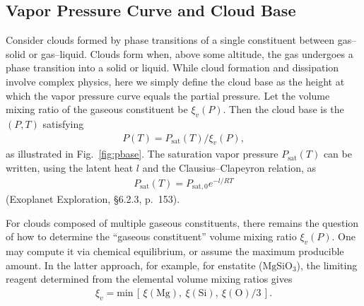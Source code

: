 \subsection*{Vapor Pressure Curve and Cloud Base}

Consider clouds formed by phase transitions of a single constituent between gas–solid or gas–liquid.  
Clouds form when, above some altitude, the gas undergoes a phase transition into a solid or liquid.  
While cloud formation and dissipation involve complex physics, here we simply define the cloud base as the height at which the vapor pressure curve equals the partial pressure.  
Let the volume mixing ratio of the gaseous constituent be $\xi_v(P)$.  
Then the cloud base is the $(P,T)$ satisfying
\begin{align}
P(T) = P_\mathrm{sat}(T)/\xi_v(P),
\end{align}
as illustrated in Fig.~\ref{fig:pbase}.  
The saturation vapor pressure $P_\mathrm{sat}(T)$ can be written, using the latent heat $l$ and the Clausius–Clapeyron relation, as
\begin{align}
P_\mathrm{sat}(T) = P_\mathrm{sat,0} e^{-l/RT}
\end{align}
(Exoplanet Exploration, §6.2.3, p.~153).

For clouds composed of multiple gaseous constituents, there remains the question of how to determine the ``gaseous constituent'' volume mixing ratio $\xi_v(P)$.  
One may compute it via chemical equilibrium, or assume the maximum producible amount.  
In the latter approach, for example, for enstatite ($\mathrm{MgSiO_3}$), the limiting reagent determined from the elemental volume mixing ratios gives
\begin{align}
\xi_v = \mathrm{min}\,[ \,\xi(\mathrm{Mg}),\ \xi(\mathrm{Si}),\ \xi(\mathrm{O})/3 \, ].
\end{align}

